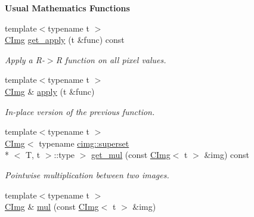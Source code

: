 \begin{Indent}{\bf Usual Mathematics Functions}\par
\begin{DoxyCompactItemize}
\item 
\hypertarget{structcimg__library_1_1_c_img_a8a553a156adaf0a3941867b79a4a02f3}{{\footnotesize template$<$typename t $>$ }\\\hyperlink{structcimg__library_1_1_c_img}{C\-Img} \hyperlink{structcimg__library_1_1_c_img_a8a553a156adaf0a3941867b79a4a02f3}{get\-\_\-apply} (t \&func) const }\label{structcimg__library_1_1_c_img_a8a553a156adaf0a3941867b79a4a02f3}

\begin{DoxyCompactList}\small\item\em Apply a R-\/$>$R function on all pixel values. \end{DoxyCompactList}\item 
\hypertarget{structcimg__library_1_1_c_img_a965622aa6f4b15a61f7ff1958f919ceb}{{\footnotesize template$<$typename t $>$ }\\\hyperlink{structcimg__library_1_1_c_img}{C\-Img} \& \hyperlink{structcimg__library_1_1_c_img_a965622aa6f4b15a61f7ff1958f919ceb}{apply} (t \&func)}\label{structcimg__library_1_1_c_img_a965622aa6f4b15a61f7ff1958f919ceb}

\begin{DoxyCompactList}\small\item\em In-\/place version of the previous function. \end{DoxyCompactList}\item 
\hypertarget{structcimg__library_1_1_c_img_a755fd339bef19e6809873db1d6452328}{{\footnotesize template$<$typename t $>$ }\\\hyperlink{structcimg__library_1_1_c_img}{C\-Img}$<$ typename \hyperlink{structcimg__library_1_1cimg_1_1superset}{cimg\-::superset}\\*
$<$ T, t $>$\-::type $>$ \hyperlink{structcimg__library_1_1_c_img_a755fd339bef19e6809873db1d6452328}{get\-\_\-mul} (const \hyperlink{structcimg__library_1_1_c_img}{C\-Img}$<$ t $>$ \&img) const }\label{structcimg__library_1_1_c_img_a755fd339bef19e6809873db1d6452328}

\begin{DoxyCompactList}\small\item\em Pointwise multiplication between two images. \end{DoxyCompactList}\item 
\hypertarget{structcimg__library_1_1_c_img_ad86cab89f904615e4c43b69a5454728a}{{\footnotesize template$<$typename t $>$ }\\\hyperlink{structcimg__library_1_1_c_img}{C\-Img} \& \hyperlink{structcimg__library_1_1_c_img_ad86cab89f904615e4c43b69a5454728a}{mul} (const \hyperlink{structcimg__library_1_1_c_img}{C\-Img}$<$ t $>$ \&img)}\label{structcimg__library_1_1_c_img_ad86cab89f904615e4c43b69a5454728a}


\end{DoxyCompactItemize}
\end{Indent}
